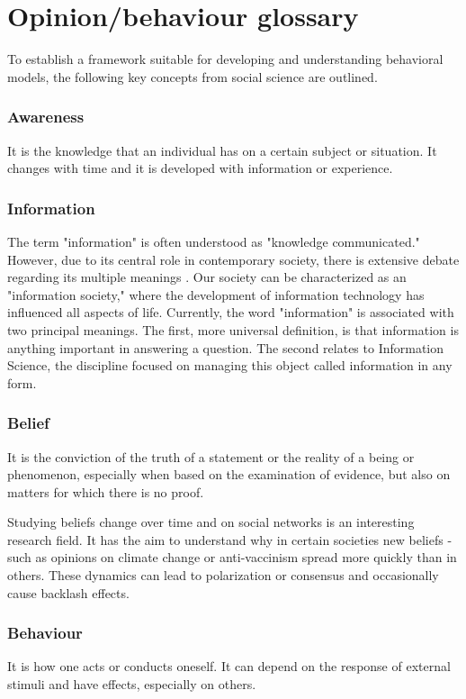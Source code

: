 \section{Opinion/behaviour glossary}
To establish a framework suitable for developing and understanding behavioral models, the following key concepts from social science are outlined.
\subsubsection{Awareness} It is the knowledge that an individual has on a certain subject or situation. It changes with time and it is developed with information or experience.  
\subsubsection{Information} The term "information" is often understood as "knowledge communicated." However, due to its central role in contemporary society, there is extensive debate regarding its multiple meanings \cite{Capurro_2003}. Our society can be characterized as an "information society," where the development of information technology has influenced all aspects of life. Currently, the word "information" is associated with two principal meanings. The first, more universal definition, is that information is anything important in answering a question. The second relates to Information Science, the discipline focused on managing this object called information in any form.
\subsubsection{Belief} It is the conviction of the truth of a statement or the reality of a being or phenomenon, especially when based on the examination of evidence, but also on matters for which there is no proof.

Studying beliefs change over time and on social networks is an interesting research field. It has the aim to understand why in certain societies new beliefs - such as opinions on climate change or anti-vaccinism spread more quickly than in others. These dynamics can lead to polarization or consensus and occasionally cause backlash effects.

\subsubsection{Behaviour} It is how one acts or conducts oneself. It can depend on the response of external stimuli and have effects, especially on others.
